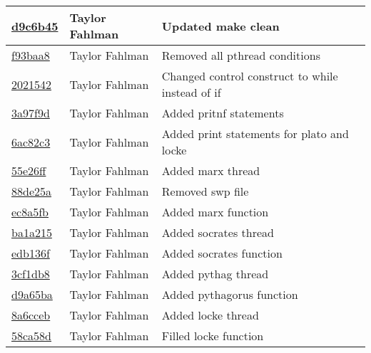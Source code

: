 \begin{tabular}{l l l}
\href{https://github.com/fahlmant/cs444/commit/d9c6b45e2f1eee4649ad42b115e750bd68d2622a}{d9c6b45} & Taylor Fahlman & Updated make clean\\\hline
\href{https://github.com/fahlmant/cs444/commit/f93baa8e24785744b1f3ae51ec64e45e62e6ea6e}{f93baa8} & Taylor Fahlman & Removed all pthread conditions\\\hline
\href{https://github.com/fahlmant/cs444/commit/2021542aebdf6ed1edee48fec117909c7b9926da}{2021542} & Taylor Fahlman & Changed control construct to while instead of if\\\hline
\href{https://github.com/fahlmant/cs444/commit/3a97f9ddf3e62cf13f868b6554fa48b76e200e64}{3a97f9d} & Taylor Fahlman & Added pritnf statements\\\hline
\href{https://github.com/fahlmant/cs444/commit/6ac82c37f00e5ac3d70cc9fce0cdd69a4b09a1c0}{6ac82c3} & Taylor Fahlman & Added print statements for plato and locke\\\hline
\href{https://github.com/fahlmant/cs444/commit/55e26ff34cc7fc3159c10da1add5024754667dbd}{55e26ff} & Taylor Fahlman & Added marx thread\\\hline
\href{https://github.com/fahlmant/cs444/commit/88de25a62a2e699650bc207419b2b384abc5a748}{88de25a} & Taylor Fahlman & Removed swp file\\\hline
\href{https://github.com/fahlmant/cs444/commit/ec8a5fbea281d6bffd2f3df386889152fadb13bc}{ec8a5fb} & Taylor Fahlman & Added marx function\\\hline
\href{https://github.com/fahlmant/cs444/commit/ba1a2150d205c820597bf84f89c025edfb785238}{ba1a215} & Taylor Fahlman & Added socrates thread\\\hline
\href{https://github.com/fahlmant/cs444/commit/edb136fac1c4ed5c5317f7a7a967bad090b32c86}{edb136f} & Taylor Fahlman & Added socrates function\\\hline
\href{https://github.com/fahlmant/cs444/commit/3cf1db8bc4cada1b6be913bc35423bd7d5f15855}{3cf1db8} & Taylor Fahlman & Added pythag thread\\\hline
\href{https://github.com/fahlmant/cs444/commit/d9a65baf438b66b6e0a9fd4cbfdf14bbb4244d5c}{d9a65ba} & Taylor Fahlman & Added pythagorus function\\\hline
\href{https://github.com/fahlmant/cs444/commit/8a6cceb7c92a712f5428de6f30d8c77f80e8dc16}{8a6cceb} & Taylor Fahlman & Added locke thread\\\hline
\href{https://github.com/fahlmant/cs444/commit/58ca58d458e413a75a8c02487bb65cf6acef3d59}{58ca58d} & Taylor Fahlman & Filled locke function\\\hline

\end{tabular}
